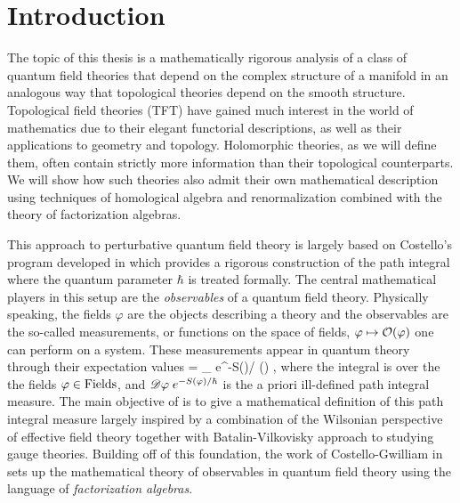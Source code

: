 \chapter{Introduction}

The topic of this thesis is a mathematically rigorous analysis of a class of quantum field theories that depend on the complex structure of a manifold in an analogous way that topological theories depend on the smooth structure. 
Topological field theories (TFT) have gained much interest in the world of mathematics due to their elegant functorial descriptions, as well as their applications to geometry and topology. 
Holomorphic theories, as we will define them, often contain strictly more information than their topological counterparts.
We will show how such theories also admit their own mathematical description using techniques of homological algebra and renormalization combined with the theory of factorization algebras. 

This approach to perturbative quantum field theory is largely based on Costello's program developed in \cite{CostelloRenormalization} which provides a rigorous construction of the path integral where the quantum parameter $\hbar$ is treated formally. 
The central mathematical players in this setup are the {\em observables} of a quantum field theory. 
Physically speaking, the fields $\varphi$ are the objects describing a theory and the observables are the so-called measurements, or functions on the space of fields, $\varphi \mapsto \mathcal O(\varphi)$ one can perform on a system.
These measurements appear in quantum theory through their expectation values
\ben
\<\cO\> = \int_{\varphi {}} \sD \varphi \; e^{-S(\varphi)/ \hbar} \;  \cO(\varphi) ,
\een
where the integral is over the the fields $\varphi \in {\rm Fields}$, and $\mathscr D \varphi \; e^{-S(\varphi)/ \hbar}$ is the a priori ill-defined path integral measure.
The main objective of \cite{CostelloRenormalization} is to give a mathematical definition of this path integral measure largely inspired by a combination of the Wilsonian perspective of effective field theory together with Batalin-Vilkovisky approach to studying gauge theories.
Building off of this foundation, the work of Costello-Gwilliam in \cite{CG1,CG2} sets up the mathematical theory of observables in quantum field theory using the language of {\em factorization algebras}. 

